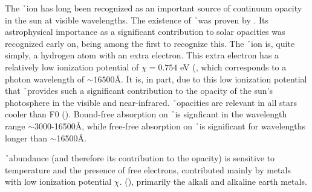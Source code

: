 
The \h\ ion has long been recognized as an important source of
continuum opacity in the sun at visible
wavelengths. The existence of \h\ was proven by \cite{bethe1929}. Its
astrophysical importance as a significant contribution to solar
opacities was recognized early on, \citet{Wildt1939a,Wildt1939b} being among the first to
recognize this.  The \h\ ion is, quite simply, a hydrogen atom with an extra electron.  This extra electron
has a relatively low ionization potential of $\chi = 0.754$ eV
(\citealt{carroll2007introduction}, which corresponds to a photon
wavelength of $\sim 16500$\AA.  It is, in part, due to this low
ionization potential that \h\ provides such  a significant contribution to the opacity of the sun's
photosphere in the visible and near-infrared.  \h\ opacities are relevant in all
stars cooler than F0 (\citealt{carroll2007introduction}). Bound-free
absorption on \h\ is signficant in the wavelength range
$\sim$3000-16500\AA, while free-free absorption on \h\ is significant
for wavelengths longer than $\sim$16500\AA.  

 \h\ abundance (and therefore its contribution to the opacity) is sensitive 
to temperature and the presence of free electrons, contributed mainly
by metals with low ionization potential $\chi$.
(\citealt{hansen1994stellar}), primarily the alkali and alkaline earth
metals.  


